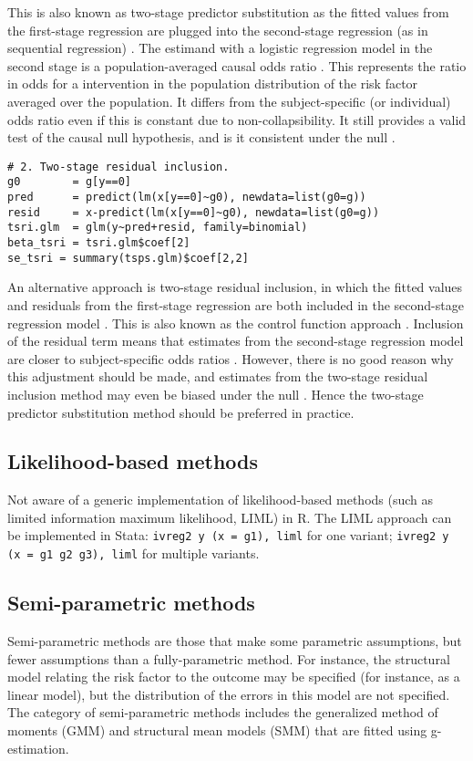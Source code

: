 \documentclass[a4paper,12pt]{article} %
\begin{document}
This is also known as two-stage predictor substitution as the fitted values from the first-stage regression are plugged into the second-stage regression (as in sequential regression) \citep{cai2011}. The estimand with a logistic regression model in the second stage is a population-averaged causal odds ratio . This represents the ratio in odds for a intervention in the population distribution of the risk factor averaged over the population. It differs from the subject-specific (or individual) odds ratio even if this is constant due to non-collapsibility. It still provides a valid test of the causal null hypothesis, and is it consistent under the null \citep{vansteelandt2010}.

\begin{lstlisting}
# 2. Two-stage residual inclusion.
g0        = g[y==0]
pred      = predict(lm(x[y==0]~g0), newdata=list(g0=g))
resid     = x-predict(lm(x[y==0]~g0), newdata=list(g0=g))
tsri.glm  = glm(y~pred+resid, family=binomial)
beta_tsri = tsri.glm$coef[2]
se_tsri = summary(tsps.glm)$coef[2,2]
\end{lstlisting}

An alternative approach is two-stage residual inclusion, in which the fitted values and residuals from the first-stage regression are both included in the second-stage regression model \citep{terza2008}. This is also known as the control function approach \citep{nagelkerke2000}. Inclusion of the residual term means that estimates from the second-stage regression model are closer to subject-specific odds ratios \citep{palmer2008b}. However, there is no good reason why this adjustment should be made, and estimates from the two-stage residual inclusion method may even be biased under the null \citep{vansteelandt2010}. Hence the two-stage predictor substitution method should be preferred in practice.

\clearpage

\subsection{Likelihood-based methods}
Not aware of a generic implementation of likelihood-based methods (such as limited information maximum likelihood, LIML) in R. The LIML approach can be implemented in Stata: \texttt{ivreg2 y (x = g1), liml} for one variant; \texttt{ivreg2 y (x = g1 g2 g3), liml} for multiple variants.

\clearpage

\subsection{Semi-parametric methods}
Semi-parametric methods are those that make some parametric assumptions, but fewer assumptions than a fully-parametric method. For instance, the structural model relating the risk factor to the outcome may be specified (for instance, as a linear model), but the distribution of the errors in this model are not specified. The category of semi-parametric methods includes the generalized method of moments (GMM) and structural mean models (SMM) that are fitted using g-estimation.
\end{document}
